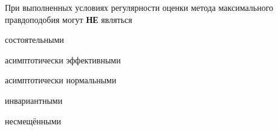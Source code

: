 
\begin{question}
При выполненных условиях регулярности оценки метода максимального
правдоподобия могут \textbf{НЕ} являться
\begin{answerlist}
  \item состоятельными
  \item асимптотически эффективными
  \item асимптотически нормальными
  \item инвариантными
  \item несмещёнными
\end{answerlist}
\end{question}


